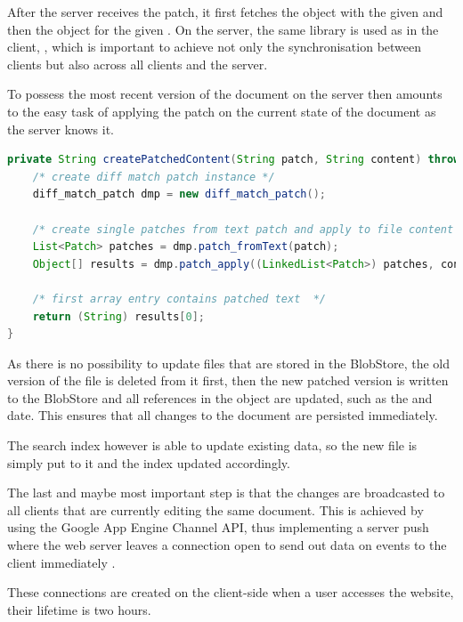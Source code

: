 After the server receives the patch, it first fetches the  object with the given  and then the  object for the given . On the server, the same library is used as in the client, , which is important to achieve not only the synchronisation between clients but also across all clients and the server.

To possess the most recent version of the document on the server then amounts to the easy task of applying the patch on the current state of the document as the server knows it.

\begin{lstlisting}[language=Java, caption=Applying the Patch for a Document on the CollaboraTeX Server]
private String createPatchedContent(String patch, String content) throws IllegalArgumentException {
    /* create diff match patch instance */
    diff_match_patch dmp = new diff_match_patch();
    
    /* create single patches from text patch and apply to file content */
    List<Patch> patches = dmp.patch_fromText(patch);
    Object[] results = dmp.patch_apply((LinkedList<Patch>) patches, content);
    
    /* first array entry contains patched text  */
    return (String) results[0];
}
\end{lstlisting}

As there is no possibility to update files that are stored in the BlobStore, the old version of the file is deleted from it first, then the new patched version is written to the BlobStore and all references in the  object are updated, such as the  and  date. This ensures that all changes to the document are persisted immediately.

The search index however is able to update existing data, so the new file is simply put to it and the index updated accordingly.

The last and maybe most important step is that the changes are broadcasted to all clients that are currently editing the same document. This is achieved by using the Google App Engine Channel API, thus implementing a server push where the web server leaves a connection open to send out data on events to the client immediately \cite{burke2013restful}. 

These connections are created on the client-side when a user accesses the website, their lifetime is two hours.


